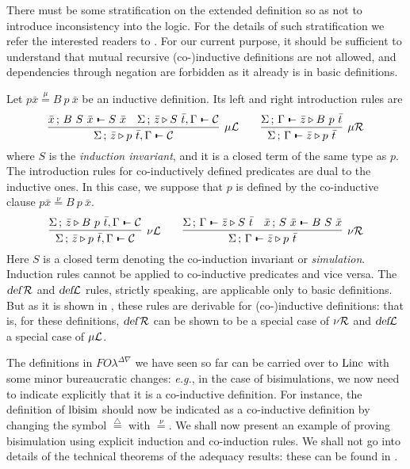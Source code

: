 \documentclass{acmtrans2m}
\def\Cscr{{\mathcal C}}
\def\relbar{\mathrel{\smash-}}
\def\joinrelm{\mathrel{\mkern-3.2mu}}
\def\tailpiece{\kern 1pt\vrule height 1ex width 0.3ex depth -.25ex}
\def\seqsym{\mathrel{\tailpiece\joinrelm\relbar}}
\newcommand{\FOL   }{FO\lambda}
\newcommand{\FOLDNb}{\FOL^{\Delta\nabla}}
\newcommand{\Linc}{{\rm Linc}}
\newcommand{\Judg}[2]{#1\triangleright#2}
\newcommand{\NSeq}[3]{#1\,;\,#2 \seqsym #3}
\newcommand{\defL}{\hbox{\sl def}{\cal L}}
\newcommand{\defR}{\hbox{\sl def\/{}}{\cal R}}
\newcommand{\defeq}{\mathrel{\stackrel{{\scriptscriptstyle\triangle}}{=}}}
\newcommand{\defmu}{\mathrel{\stackrel{\mu}{=}}}
\newcommand{\defnu}{\mathrel{\stackrel{\nu}{=}}}
\newcommand{\indR}{\mu {\cal R}}
\newcommand{\indL}{\mu {\cal L}}
\newcommand{\coindR}{\nu {\cal R}}
\newcommand{\coindL}{\nu {\cal L}}
\begin{document}
There must be some stratification on the extended definition
so as not to introduce inconsistency into the logic.
For the details of such stratification we refer the interested 
readers to \cite{tiu04phd}. For our current purpose, it should be
sufficient to understand that mutual recursive (co-)inductive definitions are
not allowed, and dependencies through negation are forbidden
as it already is in basic definitions.

Let $p\bar x \defmu B~p~\bar x$ be an inductive definition. Its left and
right introduction rules are
$$
\infer[\indL]
{\NSeq{\Sigma}{\Judg{\bar z}{p~\bar t}, \Gamma}{\Cscr}}
{
\NSeq{\bar x}{B~S~\bar x}{S~\bar x}
&
\NSeq{\Sigma}{\Judg{\bar z}{S~\bar t}, \Gamma}{\Cscr}
}
\qquad
\infer[\indR]
{\NSeq{\Sigma}{\Gamma}{\Judg{\bar z}{p~\bar t}}}
{\NSeq{\Sigma}{\Gamma}{\Judg{\bar z}{B~p~\bar t}}}
$$
where $S$ is the {\em induction invariant}, and it is a closed term 
of the same type as $p$. 
The introduction rules for co-inductively defined predicates are dual
to the inductive ones. In this case, we suppose that $p$ is 
defined by the co-inductive clause $p \bar x \defnu B~p~\bar x$.
$$
\infer[\coindL]
{\NSeq{\Sigma}{\Judg{\bar z}{p~\bar t},\Gamma}{\Cscr}}
{
\NSeq{\Sigma}{\Judg{\bar z}{B~p~\bar t}, \Gamma}{\Cscr}
}
\qquad
\infer[\coindR]
{\NSeq{\Sigma}{\Gamma}{\Judg{\bar z}{p~\bar t}}}
{
\NSeq{\Sigma}{\Gamma}{\Judg{\bar z}{S~\bar t}}
&
\NSeq{\bar x}{S~\bar x}{B~S~\bar x}
}
$$
Here $S$ is a closed term denoting the co-induction invariant
or {\em simulation}. 
Induction rules cannot be applied to co-inductive predicates and
vice versa. The $\defR$ and $\defL$ rules, strictly speaking,
are applicable only to basic definitions. But as it is shown
in \cite{tiu04phd}, these rules are derivable for (co-)inductive
definitions: that is, for these definitions, $\defR$ can be shown to be 
a special case of $\coindR$ and $\defL$ a special case of $\indL$.

The definitions in $\FOLDNb$ we have seen so far can be carried over to
$\Linc$ with some minor bureaucratic changes: {\em e.g.}, in the case of bisimulations, 
we now need to indicate explicitly that it is a co-inductive definition.
For instance, the definition of $\hbox{lbisim}$ should now be indicated as 
a co-inductive definition by changing the symbol $\defeq$ with $\defnu$.
We shall now present an example of proving bisimulation using explicit
induction and co-induction rules. We shall not go into details of the technical 
theorems of the adequacy results: these can be found in \cite{tiu04phd}.
\end{document}
